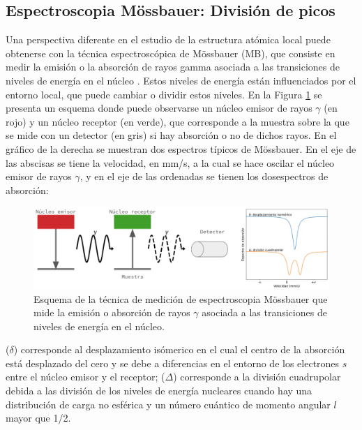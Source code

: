 \subsection{Espectroscopia Mössbauer: División de picos}

Una perspectiva diferente en el estudio de la estructura atómica local puede 
obtenerse con la técnica espectroscópica de Mössbauer (MB), que consiste en medir 
la emisión o la absorción de rayos gamma asociada a las transiciones de niveles
de energía en el núcleo \cite{long2013}. Estos niveles de energía están 
influenciados por el entorno local, que puede cambiar o dividir estos niveles.
En la Figura \ref{fig:esquema-mossbauer} se presenta un esquema donde puede observarse un núcleo emisor de rayos $\gamma$ (en rojo) y un núcleo receptor (en verde), que corresponde a la muestra sobre la que se mide con un detector (en gris) si hay absorción o no de dichos rayos. En el gráfico de la derecha se muestran dos espectros típicos de Mössbauer. En el eje de las abscisas se tiene la velocidad, en mm/s, a la cual se hace oscilar el núcleo emisor de rayos $\gamma$, y en el eje de las ordenadas se tienen los dosespectros de absorción: 
\begin{figure}[h!]
    \centering
    \includegraphics[width=\textwidth]{Silicio/prediccion/resultados/mossbauer/esquema_mossbauer.png}
    \caption{Esquema de la técnica de medición de espectroscopia Mössbauer que mide la emisión o absorción de rayos $\gamma$ asociada a las transiciones de niveles de energía en el núcleo.}
    \label{fig:esquema-mossbauer}
\end{figure}
($\delta$) corresponde al desplazamiento isómerico en el cual el centro de la absorción 
está desplazado del cero y se debe a diferencias en el entorno de los 
electrones $s$ entre el núcleo emisor y el receptor; ($\Delta$) corresponde a la división cuadrupolar debida a las división de los niveles de energía nucleares cuando hay una distribución de carga no esférica y un número cuántico de momento angular $l$ mayor que 1/2.

